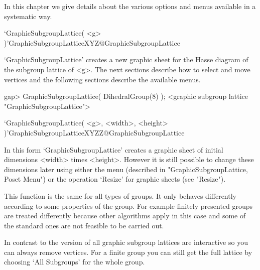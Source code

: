 
In this chapter we give details about the various options and menus
available in a systematic way.


\>`GraphicSubgroupLattice( <g> )'{GraphicSubgroupLatticeXYZ}@{GraphicSubgroupLattice}

`GraphicSubgroupLattice' creates a new graphic sheet for the Hasse
diagram of the subgroup lattice of <g>.  The next sections describe
how to select and move vertices and the following sections describe the
available menus.

\begintt
gap> GraphicSubgroupLattice( DihedralGroup(8) );
<graphic subgroup lattice "GraphicSubgroupLattice">
\endtt

\>`GraphicSubgroupLattice( <g>, <width>, <height> )'{GraphicSubgroupLatticeXYZZ}@{GraphicSubgroupLattice}

In this form `GraphicSubgroupLattice' creates a graphic sheet of initial
dimensions <width> times <height>.  However it is still possible to change
these dimensions later using either the menu (described in
"GraphicSubgroupLattice, Poset Menu") or the operation `Resize' for graphic 
sheets (see "Resize").

This function is the same for all types of groups. It only behaves differently
according to some properties of the group. For example finitely presented
groups are treated differently because other algorithms apply in this case
and some of the standard ones are not feasible to be carried out. 

In contrast to the {} version of {\XGAP} all graphic subgroup lattices 
are interactive so you can always remove vertices. For a finite group you 
can still get the full lattice by choosing `All Subgroups' for the whole 
group.

%


